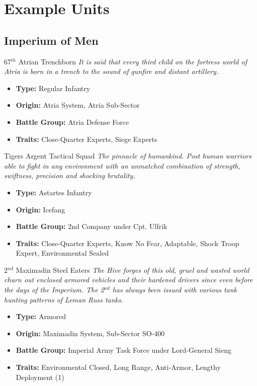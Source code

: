 \chapter{Example Units}
\section{Imperium of Men}
\begin{DndSidebar}{67$^{th}$ Atrian Trenchborn}
\textit{It is said that every third child on the fortress world of Atria is born in a trench to the sound of gunfire and distant artillery.}
\begin{itemize}
	\item \textbf{Type:} Regular Infantry
	\item \textbf{Origin:} Atria System, Atria Sub-Sector
	\item \textbf{Battle Group:} Atria Defense Force 
	\item \textbf{Traits:} Close-Quarter Experts, Siege Experts
\end{itemize}
\end{DndSidebar}

\begin{DndSidebar}{Tigers Argent Tactical Squad}
\textit{The pinnacle of humankind. Post human warriors able to fight in any environment with an unmatched combination of strength, swiftness, precision and shocking brutality.}
\begin{itemize}
	\item \textbf{Type:} Astartes Infantry
	\item \textbf{Origin:} Icefang
	\item \textbf{Battle Group:} 2nd Company under Cpt. Ulfrik 
	\item \textbf{Traits:} Close-Quarter Experts, Know No Fear, Adaptable, Shock Troop Expert, Environmental Sealed
\end{itemize}
\end{DndSidebar}

\begin{DndSidebar}{2$^{nd}$ Maximadin Steel Eaters}
\textit{The Hive forges of this old, gruel and wasted world churn out enclosed armored vehicles and their hardened drivers since even before the days of the Imperium. The 2$^{nd}$ has always been issued with various tank hunting patterns of Leman Russ tanks.}
\begin{itemize}
	\item \textbf{Type:} Armored
	\item \textbf{Origin:} Maximadin System, Sub-Sector SO-400
	\item \textbf{Battle Group:} Imperial Army Task Force under Lord-General Sieng
	\item \textbf{Traits:} Environmental Closed, Long Range, Anti-Armor, Lengthy Deployment (1)
\end{itemize}
\end{DndSidebar}


